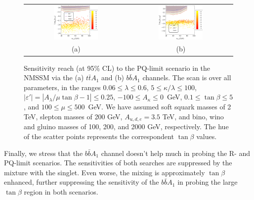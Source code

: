 \documentclass[preprintnumbers,superscriptaddress,nofootinbib,aps,prd,floatfix]{revtex4}
\begin{document}
\begin{enumerate}
\begin{figure}[htbp]
\begin{center}
\begin{tabular}{cc}
\includegraphics[width=0.45\textwidth,natwidth=610,natheight=642]{Figures/pheno/plot_PQ1_NMSSM.pdf} &
\includegraphics[width=0.45\textwidth,natwidth=610,natheight=642]{Figures/pheno/plot_PQ3_NMSSM.pdf} \\
(a) & (b) \\
\end{tabular}
\caption{Sensitivity reach (at 95\% CL)  to the PQ-limit scenario in the NMSSM via the (a) $t\bar{t}A_1$ and (b) $b\bar{b} A_1$ channels. The scan is over all
  parameters, in the ranges $0.06 \leq \lambda \leq 0.6$, $5 \leq
  \kappa / \lambda \leq 100$, $|\varepsilon'| = \left| A_\lambda/\mu \tan\beta -1\right| \leq 0.25$, $-100 \leq A_\kappa \leq 0$~GeV,
  $0.1 \leq \tan \beta \leq 5$, and $100 \leq \mu \leq 500$~GeV.  We
  have assumed soft squark masses of 2 TeV, slepton masses of 200 GeV,
  $A_{u,d,e} = 3.5$ TeV, and bino, wino and gluino masses of
  100, 200, and 2000 GeV, respectively. The hue of the scatter points represents the correspondent $\tan\beta$ values.}
\label{fig:reach_PQ} 
\end{center}
\end{figure}

\end{enumerate}

Finally, we stress that the $b\bar b A_1$ channel doesn't help much in probing the R- and PQ-limit scenarios. The sensitivities of both searches are suppressed by the mixture with the singlet. Even worse, the mixing is approximately $\tan\beta$ enhanced, further suppressing the sensitivity of the $b\bar b A_1$ in probing the large $\tan\beta$ region in both scenarios.
\end{document}
